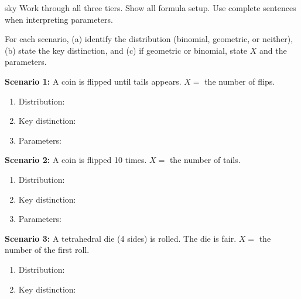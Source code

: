 \documentclass[10pt]{article}
\begin{document}
\namepartnerperiod

\vspace{0.1in}

\begin{scenariobox}[Directions]{sky}
\small
Work through all three tiers. Show all formula setup. Use complete sentences
when interpreting parameters.
\end{scenariobox}

\vspace{0.1in}

\begin{tcolorbox}[colback=goldbg, colframe=goldacc, boxrule=1pt, arc=2mm,
    title={\bfseries Tier R \quad Remediate: Identifying the Distribution},
    fonttitle=\small]
\small

For each scenario, (a) identify the distribution (binomial, geometric, or neither),
(b) state the key distinction, and (c) if geometric or binomial, state $X$ and the
parameters.

\vspace{10pt}
\textbf{Scenario 1:} A coin is flipped until tails appears.
$X =$ the number of flips.
\begin{enumerate}[label=(\alph*), leftmargin=2em, itemsep=6pt]
  \item Distribution: 
  \item Key distinction: 
  \item Parameters: 
\end{enumerate}

\vspace{10pt}
\textbf{Scenario 2:} A coin is flipped 10 times.
$X =$ the number of tails.
\begin{enumerate}[label=(\alph*), leftmargin=2em, itemsep=6pt]
  \item Distribution: 
  \item Key distinction: 
  \item Parameters: 
\end{enumerate}

\vspace{10pt}
\textbf{Scenario 3:} A tetrahedral die (4 sides) is rolled. The die is fair.
$X =$ the number of the first roll.
\begin{enumerate}[label=(\alph*), leftmargin=2em, itemsep=6pt]
  \item Distribution: 
  \item Key distinction: 
\end{enumerate}
\vspace{4pt}
\end{tcolorbox}
\end{document}
